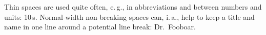 Thin spaces are used quite often, e.\,g.,
in abbreviations and between numbers and
units: 10\,s. Normal-width non-breaking
spaces can, i.\,a., help to keep a title
and name in one line around a potential
line break: Dr.~Fooboar.

